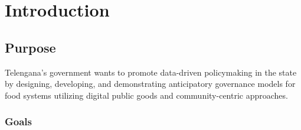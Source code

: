 \chapter{Introduction}

\section{Purpose}

Telengana’s government wants to promote data-driven policymaking in the state by designing, developing, and demonstrating anticipatory governance models for food systems utilizing digital public goods and community-centric approaches.

\subsection{Goals}
